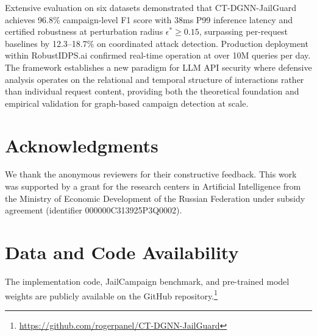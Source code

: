 \documentclass[journal]{IEEEtran}
\theoremstyle{plain}
\theoremstyle{definition}
\theoremstyle{remark}
\begin{document}
Extensive evaluation on six datasets demonstrated that CT-DGNN-JailGuard achieves 96.8\% campaign-level F1 score with 38ms P99 inference latency and certified robustness at perturbation radius $\epsilon^* \geq 0.15$, surpassing per-request baselines by 12.3--18.7\% on coordinated attack detection. Production deployment within RobustIDPS.ai confirmed real-time operation at over 10M queries per day. The framework establishes a new paradigm for LLM API security where defensive analysis operates on the relational and temporal structure of interactions rather than individual request content, providing both the theoretical foundation and empirical validation for graph-based campaign detection at scale.

\section*{Acknowledgments}

We thank the anonymous reviewers for their constructive feedback. This work was supported by a grant for the research centers in Artificial Intelligence from the Ministry of Economic Development of the Russian Federation under subsidy agreement (identifier 000000C313925P3Q0002).

\section*{Data and Code Availability}
\label{sec:data}

The implementation code, JailCampaign benchmark, and pre-trained model weights are publicly available on the GitHub repository.\footnote{\url{https://github.com/rogerpanel/CT-DGNN-JailGuard}}
\end{document}
